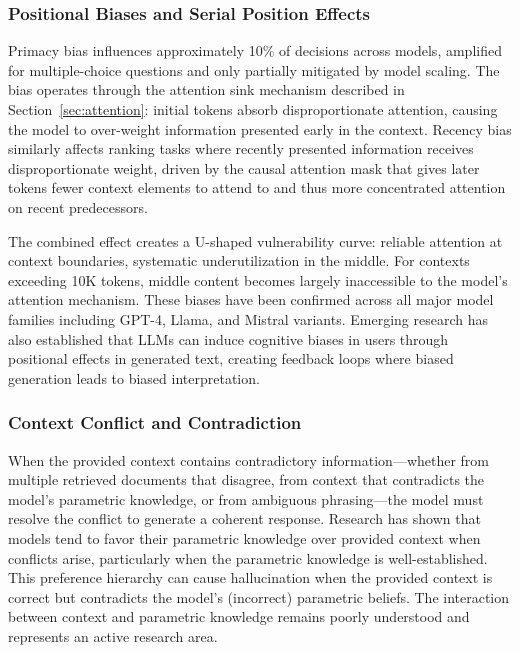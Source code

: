 \documentclass[11pt,letterpaper]{article}
\begin{document}
\subsubsection{Positional Biases and Serial Position Effects}

Primacy bias influences approximately 10\% of decisions across models, amplified for multiple-choice questions and only partially mitigated by model scaling. The bias operates through the attention sink mechanism described in Section~\ref{sec:attention}: initial tokens absorb disproportionate attention, causing the model to over-weight information presented early in the context. Recency bias similarly affects ranking tasks where recently presented information receives disproportionate weight, driven by the causal attention mask that gives later tokens fewer context elements to attend to and thus more concentrated attention on recent predecessors.

The combined effect creates a U-shaped vulnerability curve: reliable attention at context boundaries, systematic underutilization in the middle. For contexts exceeding 10K tokens, middle content becomes largely inaccessible to the model's attention mechanism. These biases have been confirmed across all major model families including GPT-4, Llama, and Mistral variants. Emerging research has also established that LLMs can induce cognitive biases in users through positional effects in generated text, creating feedback loops where biased generation leads to biased interpretation.

\subsubsection{Context Conflict and Contradiction}

When the provided context contains contradictory information---whether from multiple retrieved documents that disagree, from context that contradicts the model's parametric knowledge, or from ambiguous phrasing---the model must resolve the conflict to generate a coherent response. Research has shown that models tend to favor their parametric knowledge over provided context when conflicts arise, particularly when the parametric knowledge is well-established. This preference hierarchy can cause hallucination when the provided context is correct but contradicts the model's (incorrect) parametric beliefs. The interaction between context and parametric knowledge remains poorly understood and represents an active research area.
\end{document}
